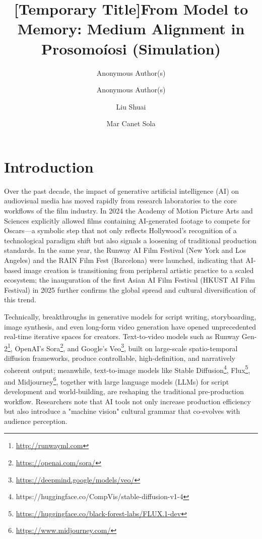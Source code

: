 \documentclass[sigconf,nonacm]{acmart}
\author{Anonymous Author(s)}
\title{[Temporary Title]From Model to Memory: Medium Alignment in Prosomoíosi (Simulation)}
\author{Anonymous Author(s)}
\affiliation{%
    \institution{Anonymous Institution}
    \city{Anonymous City}
    \country{Anonymous Country}
  }
\author{Liu Shuai}
\affiliation{%
  \institution{Academy of Media Arts Cologne (KHM)}
  \city{Cologne}
  \country{Germany}}
\author{Mar Canet Sola}
\affiliation{%
  \institution{BFM, Tallinn University, Estonia}
  \city{}
  \country{}}
\affiliation{%
  \institution{Academy of Media Art Cologne(KHM), Germany}
  \city{}
  \country{}}
\begin{document}

\maketitle

\section{Introduction}

Over the past decade, the impact of generative artificial intelligence (AI) on audiovisual media has moved rapidly from research laboratories to the core workflows of the film industry. In 2024 the Academy of Motion Picture Arts and Sciences explicitly allowed films containing AI-generated footage to compete for Oscars—a symbolic step that not only reflects Hollywood's recognition of a technological paradigm shift but also signals a loosening of traditional production standards. In the same year, the Runway AI Film Festival (New York and Los Angeles) and the RAIN Film Fest (Barcelona) were launched, indicating that AI-based image creation is transitioning from peripheral artistic practice to a scaled ecosystem; the inauguration of the first Asian AI Film Festival (HKUST AI Film Festival) in 2025 further confirms the global spread and cultural diversification of this trend.

Technically, breakthroughs in generative models for script writing, storyboarding, image synthesis, and even long-form video generation have opened unprecedented real-time iterative spaces for creators. Text-to-video models such as Runway Gen-2\footnote{\url{http://runwayml.com}}, OpenAI's Sora\footnote{\url{https://openai.com/sora/}}, and Google's Veo\footnote{\url{https://deepmind.google/models/veo/}}, built on large-scale spatio-temporal diffusion frameworks, produce controllable, high-definition, and narratively coherent output; meanwhile, text-to-image models like Stable Diffusion\footnote{https://huggingface.co/CompVis/stable-diffusion-v1-4}, Flux\footnote{\url{https://huggingface.co/black-forest-labs/FLUX.1-dev}}, and Midjourney\footnote{\url{https://www.midjourney.com/}}, together with large language models (LLMs) for script development and world-building, are reshaping the traditional pre-production workflow. Researchers note that AI tools not only increase production efficiency but also introduce a "machine vision" cultural grammar that co-evolves with audience perception.
\end{document}
